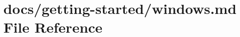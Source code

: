 \hypertarget{windows_8md}{}\section{docs/getting-\/started/windows.md File Reference}
\label{windows_8md}
